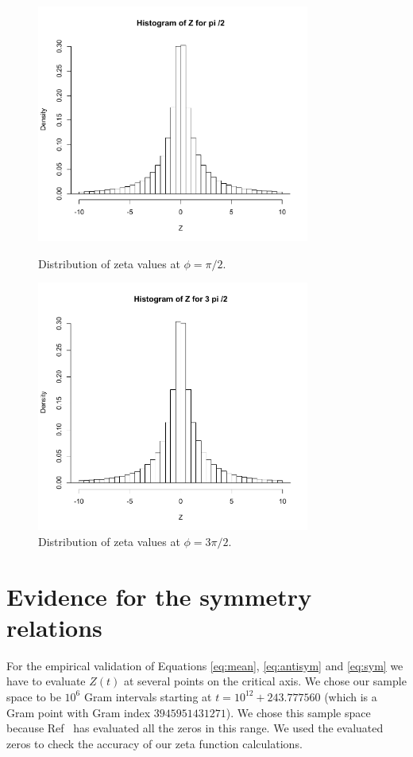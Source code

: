 \documentclass[twoside]{article}
\theoremstyle{definition}
\begin{document}
\begin{figure}
\centering
\includegraphics[width=0.8\textwidth]{pi2plot.pdf}
\caption[]{ 
 Distribution of zeta values at $\phi = \pi/2$.
  }
\vspace{1mm}
\label{pi2}
\includegraphics[width=0.8\textwidth]{3pi2plot.pdf}
\caption[]{ 
 Distribution of zeta values at $\phi = 3\pi/2$.
  }
\vspace{1mm}
\label{3pi2}
\end{figure}

\section{\label{sec3}Evidence for the symmetry relations}

For the empirical validation of Equations \ref{eq:mean}, \ref{eq:antisym} and \ref{eq:sym} we have to evaluate $Z(t)$ at several points on the critical axis. We chose our sample space to
be $10^6$ Gram intervals starting at $t=10^{12} + 243.777560$ (which is a Gram point with Gram index $3945951431271$). We chose this sample space because  Ref~\cite{hiary 2010} has evaluated all the zeros in this range. We used the evaluated zeros to check the accuracy of our zeta function calculations.
\end{document}
